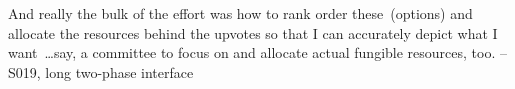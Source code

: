 \begin{displayquote}
And really the bulk of the effort was how to rank order these~(options) and allocate the resources behind the upvotes so that I can accurately depict what I want~\ldots say, a committee to focus on and allocate actual fungible resources, too. \noindent \hfill -- S019, long two-phase interface
\end{displayquote}





